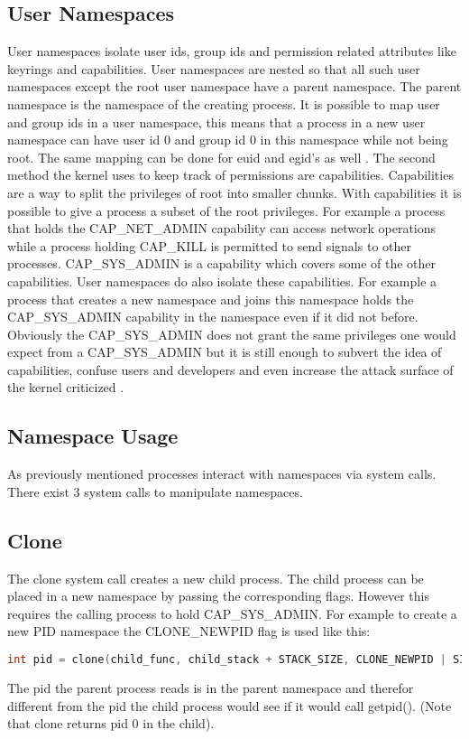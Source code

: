 \documentclass[10pt,twocolumn,a4paper]{article}
\begin{document}
\subsection{User Namespaces}
User namespaces isolate user ids, group ids and permission related attributes like keyrings and
capabilities. User namespaces are nested so that all such user namespaces except the root user namespace
have a parent namespace. The parent namespace is the namespace of the creating process. 
It is possible to map user and group ids in a user namespace, this means that a process in a new user
namespace can have user id 0 and group id 0 in this namespace while not being root. The same mapping
can be done for euid and egid's as well \cite{18}. The second method the kernel uses to keep track
of permissions are capabilities. Capabilities are a way to split the privileges of root into smaller
chunks. With capabilities it is possible to give a process a subset of the root
privileges. For example a process that holds the CAP\_NET\_ADMIN capability can access network
operations while a process holding CAP\_KILL is permitted to send signals to other
processes\cite{19}. CAP\_SYS\_ADMIN is a capability which covers some of the
other capabilities. 
User namespaces do also isolate these capabilities. For example a process that creates a new
namespace and joins this namespace holds the CAP\_SYS\_ADMIN capability in the namespace even if it did not before. Obviously the CAP\_SYS\_ADMIN does not grant the same privileges one would expect from
a  CAP\_SYS\_ADMIN but it is still enough to subvert the idea of capabilities, confuse users and
developers and even increase the attack surface of the kernel criticized \cite{20}. 

\subsection{Namespace Usage}
As previously mentioned processes interact with namespaces via system calls. There exist 3 system calls
to manipulate namespaces. 
\subsection{ Clone}
The clone system call creates a new child process. The child process can be placed in a new
namespace by passing the corresponding flags. However this requires the calling process to hold
CAP\_SYS\_ADMIN. For example to create a new PID namespace the CLONE\_NEWPID flag is used like this:
\begin{lstlisting}[language=C]
    int pid = clone(child_func, child_stack + STACK_SIZE, CLONE_NEWPID | SIGCHLD, NULL);
\end{lstlisting}
The pid the parent process reads is in the parent namespace and therefor different from the pid the
child process would see if it would call getpid(). (Note that clone returns pid 0 in the
child)\cite{22}.
\end{document}
